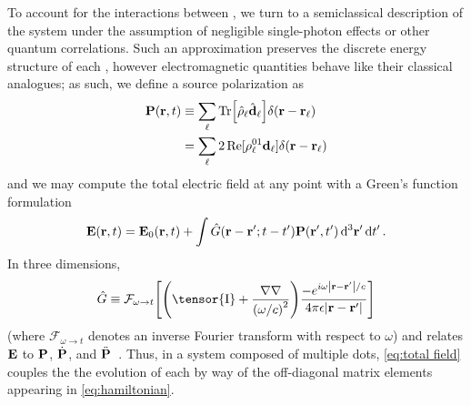 To account for the interactions between \qds{}, we turn to a semiclassical description of the system under the assumption of negligible single-photon effects or other quantum correlations.
Such an approximation preserves the discrete energy structure of each \qd{}, however electromagnetic quantities behave like their classical analogues;
as such, we define a source polarization as
\begin{equation}
  \begin{aligned}
    \vb{P}(\vb{r}, t) &\equiv \sum_\ell \Tr[\hat{\rho}_\ell \hat{\vb{d}}_\ell] \delta(\vb{r} - \vb{r}_\ell) \\
                      &= \sum_\ell 2 \Re[\rho_\ell^{01}\vb{d}_\ell]\delta(\vb{r} - \vb{r}_\ell)
  \end{aligned}
\end{equation}
and we may compute the total electric field at any point with a Green's function formulation
\begin{equation}
  \vb{E}(\vb{r}, t) = \vb{E}_0(\vb{r}, t) + \int \hat{G}(\vb{r} - \vb{r}'; t - t')\vb{P}(\vb{r}', t') \dd[3]{\vb{r}'} \dd{t'}.
  \label{eq:total field}
\end{equation}
In three dimensions,
\begin{equation}
  \hat{G} \equiv \mathcal{F}_{\omega \to t}\qty[ \qty(\tensor{\mathrm{I}} + \frac{\nabla \nabla}{\qty(\omega/c)^2})\frac{-e^{i \omega \abs{\vb{r} - \vb{r}'}/c}}{4\pi \epsilon \abs{\vb{r} - \vb{r}'}} ]
  \label{eq:dyadic}
\end{equation}
(where $\mathcal{F}_{\omega \to t}$ denotes an inverse Fourier transform with respect to $\omega$) and relates $\vb{E}$ to $\vb{P}$, $\dot{\vb{P}}$, and $\ddot{\vb{P}}$~\cite{Rothwell2009}.
Thus, in a system composed of multiple dots, \cref{eq:total field} couples the the evolution of each \qd{} by way of the off-diagonal matrix elements appearing in \cref{eq:hamiltonian}.
